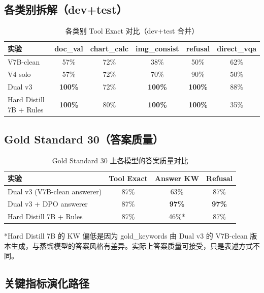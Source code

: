\documentclass[12pt,a4paper]{ctexart}
\begin{document}
\subsection{各类别拆解（dev+test）}

\begin{table}[H]
\centering
\small
\caption{各类别 Tool Exact 对比（dev+test 合并）}
\begin{tabular}{lccccc}
\toprule
实验 & doc\_val & chart\_calc & img\_consist & refusal & direct\_vqa \\
\midrule
V7B-clean & 57\% & 72\% & 38\% & 50\% & 62\% \\
V4 solo & 57\% & 72\% & 70\% & 90\% & 50\% \\
Dual v3 & \textbf{100\%} & 72\% & \textbf{100\%} & \textbf{100\%} & 88\% \\
Hard Distill 7B + Rules & \textbf{100\%} & 80\% & \textbf{100\%} & \textbf{100\%} & 35\% \\
\bottomrule
\end{tabular}
\end{table}

\subsection{Gold Standard 30（答案质量）}

\begin{table}[H]
\centering
\small
\caption{Gold Standard 30 上各模型的答案质量对比}
\begin{tabular}{lccc}
\toprule
实验 & Tool Exact & Answer KW & Refusal \\
\midrule
Dual v3 (V7B-clean answerer) & 87\% & 63\% & 87\% \\
Dual v3 + DPO answerer & 87\% & \textbf{97\%} & \textbf{97\%} \\
Hard Distill 7B + Rules & 87\% & 46\%* & 87\% \\
\bottomrule
\end{tabular}
\end{table}

*Hard Distill 7B 的 KW 偏低是因为 gold\_keywords 由 Dual v3 的 V7B-clean 版本生成，与蒸馏模型的答案风格有差异。实际上答案质量可接受，只是表述方式不同。

\subsection{关键指标演化路径}
\end{document}
